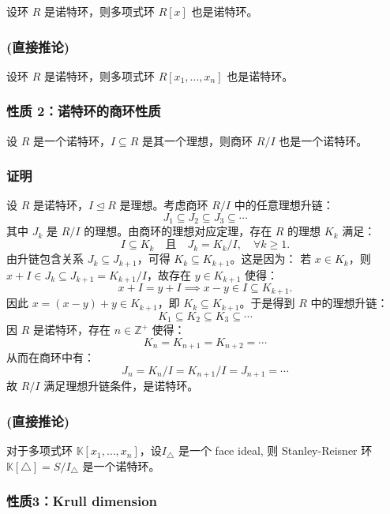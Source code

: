 \documentclass[12pt,a4paper]{ctexbook} %
\numberwithin{figure}{section}
\theoremstyle{problemstyle}
\numberwithin{equation}{section} %
\begin{document}
设环 $ R $ 是诺特环，则多项式环 $ R[x] $ 也是诺特环。

\subsubsection*{(直接推论)}
设环 $ R $ 是诺特环，则多项式环 $ R[x_1,\ldots,x_n] $ 也是诺特环。



\subsubsection*{性质 2：诺特环的商环性质}

设 $ R $ 是一个诺特环，$ I \subseteq R $ 是其一个理想，则商环 $ R/I $ 也是一个诺特环。

\subsubsection*{证明}

设 \( R \) 是诺特环，\( I \trianglelefteq R \) 是理想。考虑商环 \( R/I \) 中的任意理想升链：
\[
J_1 \subseteq J_2 \subseteq J_3 \subseteq \cdots
\]
其中 \( J_k \) 是 \( R/I \) 的理想。由商环的理想对应定理，存在 \( R \) 的理想 \( K_k \) 满足：
\[
I \subseteq K_k \quad \text{且} \quad J_k = K_k / I, \quad \forall k \geq 1.
\]
由升链包含关系 \( J_k \subseteq J_{k+1} \)，可得 \( K_k \subseteq K_{k+1} \)。这是因为：
若 \( x \in K_k \)，则 \( x + I \in J_k \subseteq J_{k+1} = K_{k+1}/I \)，故存在 \( y \in K_{k+1} \) 使得：
\[
x + I = y + I \implies x - y \in I \subseteq K_{k+1}.
\]
因此 \( x = (x - y) + y \in K_{k+1} \)，即 \( K_k \subseteq K_{k+1} \)。于是得到 \( R \) 中的理想升链：
\[
K_1 \subseteq K_2 \subseteq K_3 \subseteq \cdots
\]
因 \( R \) 是诺特环，存在 \( n \in \mathbb{Z}^+ \) 使得：
\[
K_n = K_{n+1} = K_{n+2} = \cdots
\]
从而在商环中有：
\[
J_n = K_n / I = K_{n+1} / I = J_{n+1} = \cdots
\]
故 \( R/I \) 满足理想升链条件，是诺特环。

\subsubsection*{(直接推论)}
对于多项式环 $\mathbb{K}[x_1, \ldots, x_n]$，设$I_{\triangle}$ 是一个 face ideal, 则 Stanley-Reisner 环$\mathbb{K}[\triangle]=S/I_{\triangle}$ 是一个诺特环。

\subsubsection*{性质3：Krull dimension}
\end{document}
